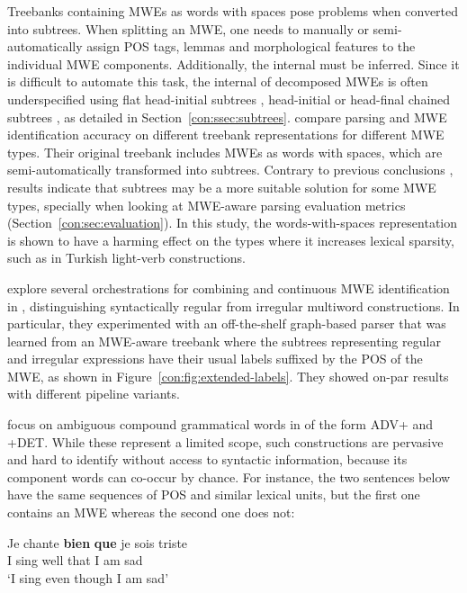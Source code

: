 \documentclass[output=paper]{langsci/langscibook}
\begin{document}
Treebanks containing MWEs as words with spaces pose problems when converted into subtrees. 
When splitting an MWE, one needs to manually or semi-automatically assign POS tags, lemmas and morphological features to the individual MWE components. 
Additionally, the internal  must be inferred.
Since it is difficult to automate this task, the internal  of decomposed MWEs is often underspecified using flat head-initial subtrees \citep{seddah13}, head-initial \citep{nivre16} or head-final chained subtrees \citep{eryigit:2011:multiword}, as detailed in Section~\ref{con:ssec:subtrees}.
\citet{eryigit:2011:multiword} compare parsing and MWE identification accuracy on different treebank representations for different MWE types.
Their original treebank includes MWEs as words with spaces, which are semi-automatically transformed into subtrees.
Contrary to previous conclusions \citep{nivre04b}, results indicate that subtrees may be a more suitable solution for some MWE types, specially when looking at MWE-aware parsing evaluation metrics (Section~\ref{con:sec:evaluation}). In this study, the words-with-spaces representation is shown to have a harming effect on the types where it increases lexical sparsity, such as in Turkish light-verb constructions.

\citet{candito2014strategies} explore several orchestrations for combining  and continuous MWE identification in , distinguishing syntactically regular from irregular multiword constructions. In particular, they experimented with an off-the-shelf graph-based parser that was learned from an MWE-aware treebank where the subtrees representing regular and irregular expressions have their usual labels suffixed by the POS of the MWE, as shown in Figure~\ref{con:fig:extended-labels}. They showed on-par results with different pipeline variants.


\citet{nasretal15} focus on ambiguous compound grammatical words in  of the form ADV+ and +DET.
While these represent a limited scope, such constructions are pervasive and hard to identify without access to syntactic information, because its component words can co-occur by chance. %
For instance, the two sentences below have the same sequences of POS and similar lexical units, but the first one contains an MWE whereas the second one does not:

\ea
\gll Je chante {\textbf{bien}} {\textbf{que}}  je sois triste\\  
     I  sing   well       that       I  am   sad\\
\glt `I sing even though I am sad'
\z 
\end{document}
